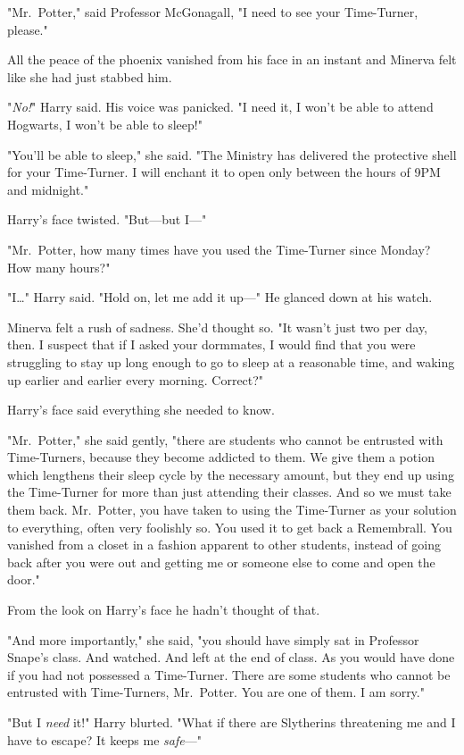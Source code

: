 "Mr.~Potter," said Professor McGonagall, "I need to see your Time-Turner, 
please."

All the peace of the phoenix vanished from his face in an instant and Minerva 
felt like she had just stabbed him.

"\emph{No!}" Harry said. His voice was panicked. "I need it, I won't be able to 
attend Hogwarts, I won't be able to sleep!"

"You'll be able to sleep," she said. "The Ministry has delivered the protective 
shell for your Time-Turner. I will enchant it to open only between the hours of 
9PM and midnight."

Harry's face twisted. "But---but I---"

"Mr.~Potter, how many times have you used the Time-Turner since Monday? How 
many hours?"

"I{\ldots}" Harry said. "Hold on, let me add it up---" He glanced down at his 
watch.

Minerva felt a rush of sadness. She'd thought so. "It wasn't just two per day, 
then. I suspect that if I asked your dormmates, I would find that you were 
struggling to stay up long enough to go to sleep at a reasonable time, and 
waking up earlier and earlier every morning. Correct?"

Harry's face said everything she needed to know.

"Mr.~Potter," she said gently, "there are students who cannot be entrusted with 
Time-Turners, because they become addicted to them. We give them a potion which 
lengthens their sleep cycle by the necessary amount, but they end up using the 
Time-Turner for more than just attending their classes. And so we must take 
them back. Mr.~Potter, you have taken to using the Time-Turner as your solution 
to everything, often very foolishly so. You used it to get back a Remembrall. 
You vanished from a closet in a fashion apparent to other students, instead of 
going back after you were out and getting me or someone else to come and open 
the door."

From the look on Harry's face he hadn't thought of that.

"And more importantly," she said, "you should have simply sat in Professor 
Snape's class. And watched. And left at the end of class. As you would have 
done if you had not possessed a Time-Turner. There are some students who cannot 
be entrusted with Time-Turners, Mr.~Potter. You are one of them. I am sorry."

"But I \emph{need} it!" Harry blurted. "What if there are Slytherins 
threatening me and I have to escape? It keeps me \emph{safe}---"

